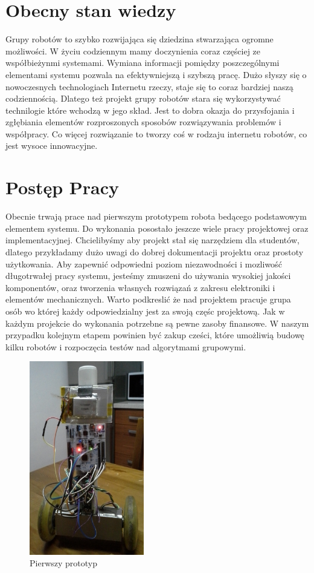 \documentclass[a4paper, 12pt]{article}
\begin{document}
\section{Obecny stan wiedzy}
Grupy robotów to szybko rozwijająca się dziedzina stwarzająca ogromne możliwości. W życiu codziennym mamy doczynienia coraz częściej ze współbieżynmi systemami. Wymiana informacji pomiędzy poszczególnymi elementami systemu pozwala na efektywniejszą i szybszą pracę. Dużo słyszy się o nowoczesnych technologiach Internetu rzeczy, staje się to coraz bardziej naszą codziennością. Dlatego też projekt grupy robotów stara się wykorzystywać technilogie które wchodzą w jego skład. Jest to dobra okazja do przysfojania i zgłębiania elementów rozproszonych sposobów rozwiązywania problemów i współpracy. Co więcej rozwiązanie to tworzy coś w rodzaju internetu robotów, co jest wysoce innowacyjne. 

\section{Postęp Pracy}
Obecnie trwają prace nad pierwszym prototypem robota bedącego podstawowym elementem systemu. Do wykonania posostało jeszcze wiele pracy projektowej oraz implementacyjnej. Chcielibyśmy aby projekt stał się narzędziem dla studentów, dlatego przykładamy dużo uwagi do dobrej dokumentacji projektu oraz prostoty użytkowania. Aby zapewnić odpowiedni poziom niezawodności i mozliwość długotrwałej pracy systemu, jesteśmy zmuszeni do używania wysokiej jakości komponentów, oraz tworzenia własnych rozwiązań z zakresu elektroniki i elementów mechanicznych. Warto podkreslić że nad projektem pracuje grupa osób wo której każdy odpowiedzialny jest za swoją częśc projektową. Jak w każdym projekcie do wykonania potrzebne są pewne zasoby finansowe. W naszym przypadku kolejnym etapem powinien być zakup cześci, które umożliwią budowę kilku robotów i rozpoczęcia testów nad algorytmami grupowymi. 

\begin{figure}
\centering
\includegraphics[width=5cm]{img/prototyp.jpg}
\caption{Pierwszy prototyp}
\label{fig:prototyp}
\end{figure}
\end{document}
